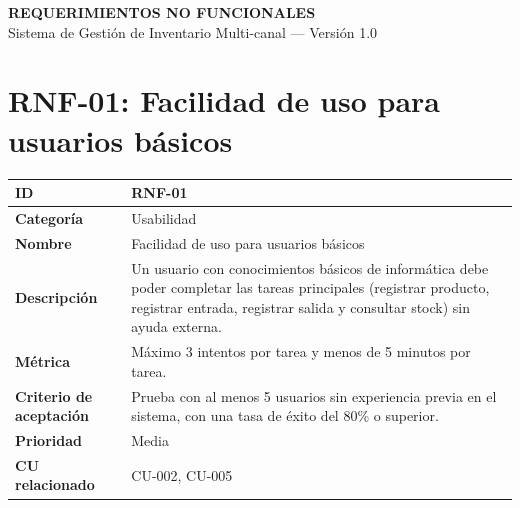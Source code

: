\documentclass{article}
\begin{document}
\begin{center}
{\Large \textbf{REQUERIMIENTOS NO FUNCIONALES}}\\[4pt]
Sistema de Gestión de Inventario Multi-canal --- Versión 1.0
\end{center}

\section*{RNF-01: Facilidad de uso para usuarios básicos}
\begin{center}
\renewcommand{\arraystretch}{1.4}
\begin{tabular}{|L{4cm}|L{12cm}|}
\hline
\textbf{ID} & RNF-01 \\
\hline
\textbf{Categoría} & Usabilidad \\
\hline
\textbf{Nombre} & Facilidad de uso para usuarios básicos \\
\hline
\textbf{Descripción} & Un usuario con conocimientos básicos de informática debe poder completar las tareas principales (registrar producto, registrar entrada, registrar salida y consultar stock) sin ayuda externa. \\
\hline
\textbf{Métrica} & Máximo 3 intentos por tarea y menos de 5 minutos por tarea. \\
\hline
\textbf{Criterio de aceptación} & Prueba con al menos 5 usuarios sin experiencia previa en el sistema, con una tasa de éxito del 80\% o superior. \\
\hline
\textbf{Prioridad} & Media \\
\hline
\textbf{CU relacionado} & CU-002, CU-005 \\
\hline
\end{tabular}
\end{center}
\end{document}
